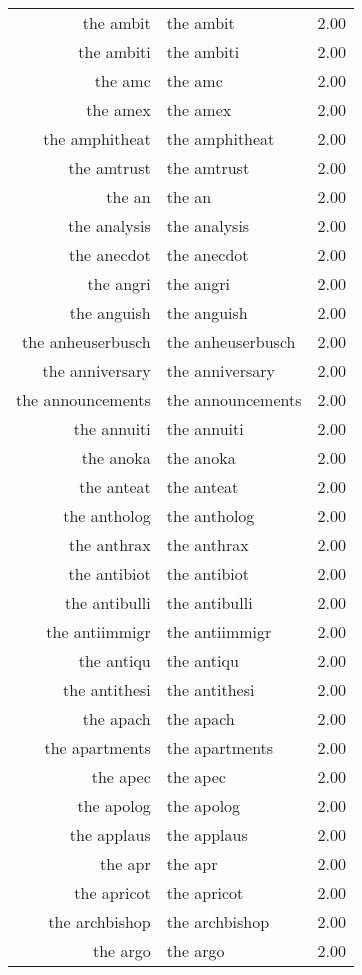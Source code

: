 \begin{table}[ht]
\begin{tabular}{rlr}
  the ambit & the ambit & 2.00 \\ 
  the ambiti & the ambiti & 2.00 \\ 
  the amc & the amc & 2.00 \\ 
  the amex & the amex & 2.00 \\ 
  the amphitheat & the amphitheat & 2.00 \\ 
  the amtrust & the amtrust & 2.00 \\ 
  the an & the an & 2.00 \\ 
  the analysis & the analysis & 2.00 \\ 
  the anecdot & the anecdot & 2.00 \\ 
  the angri & the angri & 2.00 \\ 
  the anguish & the anguish & 2.00 \\ 
  the anheuserbusch & the anheuserbusch & 2.00 \\ 
  the anniversary & the anniversary & 2.00 \\ 
  the announcements & the announcements & 2.00 \\ 
  the annuiti & the annuiti & 2.00 \\ 
  the anoka & the anoka & 2.00 \\ 
  the anteat & the anteat & 2.00 \\ 
  the antholog & the antholog & 2.00 \\ 
  the anthrax & the anthrax & 2.00 \\ 
  the antibiot & the antibiot & 2.00 \\ 
  the antibulli & the antibulli & 2.00 \\ 
  the antiimmigr & the antiimmigr & 2.00 \\ 
  the antiqu & the antiqu & 2.00 \\ 
  the antithesi & the antithesi & 2.00 \\ 
  the apach & the apach & 2.00 \\ 
  the apartments & the apartments & 2.00 \\ 
  the apec & the apec & 2.00 \\ 
  the apolog & the apolog & 2.00 \\ 
  the applaus & the applaus & 2.00 \\ 
  the apr & the apr & 2.00 \\ 
  the apricot & the apricot & 2.00 \\ 
  the archbishop & the archbishop & 2.00 \\ 
  the argo & the argo & 2.00 \\ 

\end{tabular}
\end{table}
